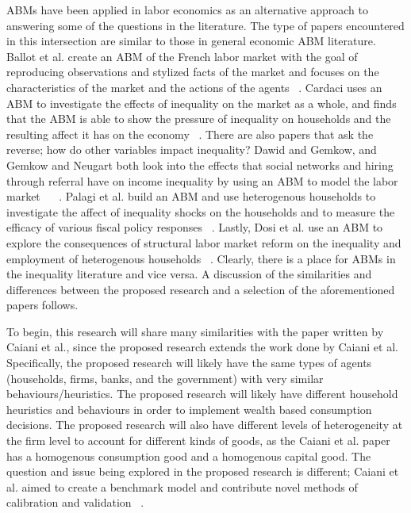 \documentclass[11pt]{article}
\begin{document}
ABMs have been applied in labor economics as an alternative approach to answering
some of the questions in the literature. The type of papers encountered in this
intersection are similar to those in general economic ABM literature. Ballot et al.
create an ABM of the French labor market with the goal of reproducing observations
and stylized facts of the market and focuses on the characteristics of the market
and the actions of the agents ~\cite{Ballot-french-paper}. Cardaci uses an ABM
to investigate the effects of inequality on the market as a whole, and finds
that the ABM is able to show the pressure of inequality on households and the
resulting affect it has on the economy ~\cite{Cardaci-housing-paper}. There are
also papers that ask the reverse; how do other variables impact inequality?
Dawid and Gemkow, and Gemkow and Neugart both look into the effects that social
networks and hiring through referral have on income inequality by using an ABM
to model the labor market ~\cite{Dawid-network-paper} ~\cite{Gemkow-network-paper}.
Palagi et al. build an ABM and use heterogenous households to investigate the
affect of inequality shocks on the households and to measure the efficacy of
various fiscal policy responses ~\cite{Palagi-redistributive-paper}. Lastly,
Dosi et al. use an ABM to explore the consequences of structural labor market
reform on the inequality and employment of heterogenous households ~\cite{Dosi-reform-paper}.
Clearly, there is a place for ABMs in the inequality literature and vice versa.
A discussion of the similarities and differences between the proposed research
and a selection of the aforementioned papers follows.

To begin, this research will share many similarities with the paper written by
Caiani et al., since the proposed research extends the work done by Caiani et al.
Specifically, the proposed research will likely have the same types of agents
(households, firms, banks, and the government) with very similar behaviours/heuristics.
 The proposed research will likely have different household heuristics and
 behaviours in order to implement wealth based consumption decisions. The
 proposed research will also have different levels of heterogeneity at the firm
 level to account for different kinds of goods, as the Caiani et al. paper has a
 homogenous consumption good and a homogenous capital good. The question and
 issue being explored in the proposed research is different; Caiani et al. aimed
 to create a benchmark model and contribute novel methods of calibration and
 validation ~\cite{Caiani-benchmark-paper}.
\end{document}
